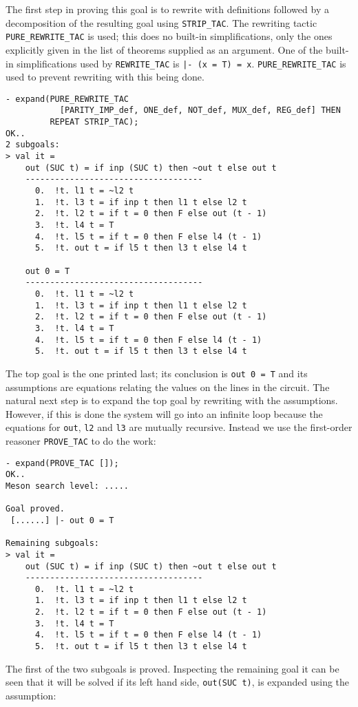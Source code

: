 The first step in proving this goal is to rewrite with definitions
followed by a decomposition of the resulting goal using
{\small\verb|STRIP_TAC|}. The rewriting tactic
{\small\verb|PURE_REWRITE_TAC|} is used; this does no built-in
simplifications, only the ones explicitly given in the list of
theorems supplied as an argument.  One of the built-in simplifications
used by {\small\verb|REWRITE_TAC|} is {\small\tt |-~(x~=~T)~=~x}.
{\small\verb|PURE_REWRITE_TAC|} is used to prevent rewriting with this
being done.
\begin{session}
\begin{verbatim}
- expand(PURE_REWRITE_TAC
           [PARITY_IMP_def, ONE_def, NOT_def, MUX_def, REG_def] THEN
         REPEAT STRIP_TAC);
OK..
2 subgoals:
> val it =
    out (SUC t) = if inp (SUC t) then ~out t else out t
    ------------------------------------
      0.  !t. l1 t = ~l2 t
      1.  !t. l3 t = if inp t then l1 t else l2 t
      2.  !t. l2 t = if t = 0 then F else out (t - 1)
      3.  !t. l4 t = T
      4.  !t. l5 t = if t = 0 then F else l4 (t - 1)
      5.  !t. out t = if l5 t then l3 t else l4 t

    out 0 = T
    ------------------------------------
      0.  !t. l1 t = ~l2 t
      1.  !t. l3 t = if inp t then l1 t else l2 t
      2.  !t. l2 t = if t = 0 then F else out (t - 1)
      3.  !t. l4 t = T
      4.  !t. l5 t = if t = 0 then F else l4 (t - 1)
      5.  !t. out t = if l5 t then l3 t else l4 t
\end{verbatim}
\end{session}

The top goal is the one printed last; its conclusion is
{\small\verb|out 0 = T|} and its assumptions are equations relating
the values on the lines in the circuit.  The natural next step is to
expand the top goal by rewriting with the assumptions.  However, if
this is done the system will go into an infinite loop because the
equations for {\small\verb|out|}, {\small\verb|l2|} and
{\small\verb|l3|} are mutually recursive.  Instead we use the
first-order reasoner {\small\verb|PROVE_TAC|} to do the work:

\begin{session}
\begin{verbatim}
- expand(PROVE_TAC []);
OK..
Meson search level: .....

Goal proved.
 [......] |- out 0 = T

Remaining subgoals:
> val it =
    out (SUC t) = if inp (SUC t) then ~out t else out t
    ------------------------------------
      0.  !t. l1 t = ~l2 t
      1.  !t. l3 t = if inp t then l1 t else l2 t
      2.  !t. l2 t = if t = 0 then F else out (t - 1)
      3.  !t. l4 t = T
      4.  !t. l5 t = if t = 0 then F else l4 (t - 1)
      5.  !t. out t = if l5 t then l3 t else l4 t
\end{verbatim}
\end{session}
The first of the two subgoals is proved.  Inspecting the remaining
goal it can be seen that it will be solved if its left hand side,
{\small\verb|out(SUC t)|}, is expanded using the assumption: \medskip

